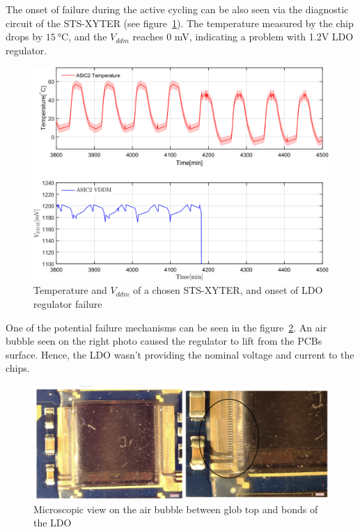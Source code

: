 The onset of failure during the active cycling can be also seen via the diagnostic circuit of the \gls{STS}-XYTER (see figure~\ref{fig_active_failure}). The temperature measured by the chip drops by $\SI{15}{\celsius}$, and the $V_{ddm}$ reaches 0 mV, indicating a problem with 1.2V \gls{LDO} regulator. 

\begin{figure}[!h]
\centering
\includegraphics[width=0.6\columnwidth]{Chapter4/images/FEB2ASIC2COMP1.png}
\caption{Temperature and $V_{ddm}$ of a chosen \gls{STS}-XYTER, and onset of \gls{LDO} regulator failure}
\label{fig_active_failure}
\end{figure}

One of the potential failure mechanisms can be seen in the figure~\ref{fig_ldo_lift}. An air bubble seen on the right photo caused the regulator to lift from the \glspl{PCB} surface. Hence, the \gls{LDO} wasn't providing the nominal voltage and current to the chips. 

\begin{figure}[!h]
\centering
\includegraphics[width=0.8\columnwidth]{Chapter4/images/FEB_81_LDO_lift.png}
\caption{Microscopic view on the air bubble between glob top and bonds of the \gls{LDO}}
\label{fig_ldo_lift}
\end{figure}
\newpage
